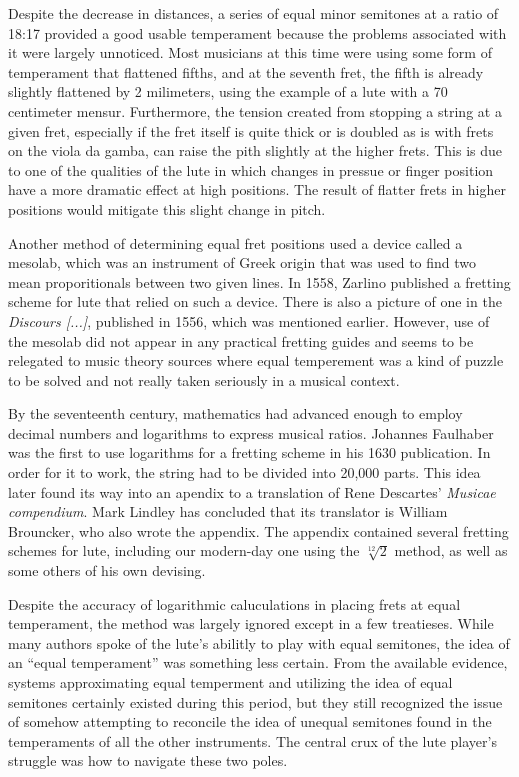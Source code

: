 Despite the decrease in distances, a series of equal minor semitones at a ratio of 18:17
provided a good usable temperament because the problems associated with it were largely unnoticed.
Most musicians at this time were using some form of temperament that flattened fifths, and at the
seventh fret, the fifth is already slightly flattened by 2 milimeters, using the example of a
lute with a 70 centimeter mensur.  Furthermore, the tension created from stopping a string
at a given fret, especially if the fret itself is quite thick or is doubled as is with frets
on the viola da gamba, can raise the pith slightly at the higher frets. \autocite[21]{ML:1}  This
is due to one of the qualities of the lute in which changes in pressue or finger position have a
more dramatic effect at high positions.  The result of flatter frets in higher
positions would mitigate this slight change in pitch.

Another method of determining equal fret positions used a device called a mesolab, which was
an instrument of Greek origin that was used to find two mean proporitionals between two
given lines.  In 1558, Zarlino published a fretting scheme for lute that relied on such a device.
\autocite[26]{ML:1}  There is also a picture of one in the \textit{Discours [...]}, published in
1556, which was mentioned earlier.  However, use of the mesolab did not appear in any practical
fretting guides and seems to be relegated to music theory sources where equal temperement
was a kind of puzzle to be solved and not really taken seriously in a musical context.

By the seventeenth century, mathematics had advanced enough to employ decimal numbers and
logarithms to express musical ratios.  Johannes Faulhaber was the first to use logarithms for
a fretting scheme in his 1630 publication. \autocite[21]{ML:1}  In order for it to work, the
string had to be divided into 20,000 parts.  This idea later found its way into an apendix
to a translation of Rene Descartes' \textit{Musicae compendium}.  Mark Lindley has concluded
that its translator is William Brouncker, who also wrote the appendix.  The appendix contained
several fretting schemes for lute, including our modern-day one using the $ \sqrt[12]{2} $ method,
as well as some others of his own devising.

Despite the accuracy of logarithmic caluculations in placing frets at equal temperament, the
method was largely ignored except in a few treatieses.  While many authors spoke of the lute's
abilitly to play with equal semitones, the idea of an ``equal temperament'' was something less
certain.  From the available evidence, systems approximating equal temperment and utilizing
the idea of equal semitones certainly existed during this period, but they still recognized
the issue of somehow attempting to reconcile the idea of unequal semitones found in the
temperaments of all the other instruments.  The central crux of the lute player's struggle
was how to navigate these two poles.

